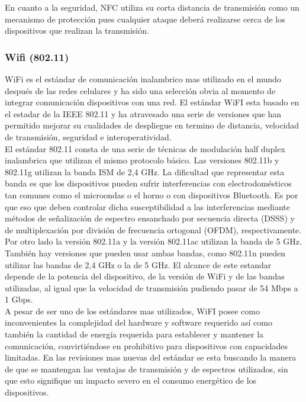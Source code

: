 En cuanto a la seguridad, NFC utiliza su corta distancia de transmisión como un mecanismo de protección pues cualquier ataque deberá realizarse cerca de los dispositivos que realizan la transmisión. 

\subsubsection{Wifi (802.11)} 
WiFi es el estándar de comunicación inalambrico mas utilizado en el mundo después de las redes celulares y ha sido una selección obvia al momento de integrar comunicación dispositivos con una red. El estándar WiFI esta basado en el estadar de la IEEE 802.11\cite{ieee80211} y ha atravesado una serie de versiones que han permitido mejorar su cualidades de despliegue en termino de distancia, velocidad de transmisión, seguridad e interoperatividad.\\  

El estándar 802.11 consta de una serie de técnicas de modulación half duplex inalambrica que utilizan el mismo protocolo básico. Las versiones 802.11b y 802.11g utilizan la banda ISM de 2,4 GHz. La dificultad que representar esta banda es que los dispositivos pueden sufrir interferencias con electrodomésticos tan comunes como el microondas o el horno o con dispositivos Bluetooth. Es por que eso que deben controlar dicha susceptibilidad a las interferencias mediante métodos de señalización de espectro ensanchado por secuencia directa (DSSS) y de multiplexación por división de frecuencia ortogonal (OFDM), respectivamente.\\

Por otro lado la versión 802.11a y la versión 802.11ac utilizan la banda de 5 GHz. También hay versiones que pueden usar ambas bandas, como 802.11n pueden utilizar las bandas de 2,4 GHz o la de 5 GHz. El alcance de este estandar depende de la potencia del dispositivo, de la versión de WiFi y de las bandas utilizadas, al igual que la velocidad de transmisión pudiendo pasar de 54 Mbps a 1 Gbps. \\

A pesar de ser uno de los estándares mas utilizados, WiFI posee como inconvenientes la complejidad del hardware y software requerido así como también la cantidad de energía requerida para  establecer y mantener la comunicación, convirtiéndose en prohibitivo para dispositivos con capacidades limitadas. En las revisiones mas nuevas del estándar se esta buscando  la manera de que se mantengan las ventajas de transmisión y de espectros utilizados, sin que esto signifique un impacto severo en el consumo energético de los dispositivos. 

